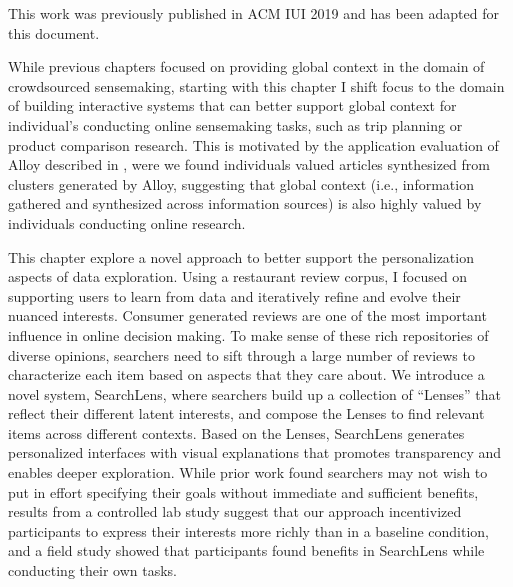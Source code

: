 
{\rmfamily
This work was previously published in ACM IUI 2019 \cite{searchlens} and has been adapted for this document.
}

While previous chapters focused on providing global context in the domain of crowdsourced sensemaking, starting with this chapter I shift focus to the domain of building interactive systems that can better support global context for individual's conducting online sensemaking tasks, such as trip planning or product comparison research. This is motivated by the application evaluation of Alloy described in , were we found individuals valued articles synthesized from clusters generated by Alloy, suggesting that global context (i.e., information gathered and synthesized across information sources) is also highly valued by individuals conducting online research.

This chapter explore a novel approach to better support the personalization  aspects of data exploration. Using a restaurant review corpus, I focused on supporting users to learn from data and iteratively refine and evolve their nuanced interests. Consumer generated reviews are one of the most important influence in online decision making. To make sense of these rich repositories of diverse opinions, searchers need to sift through a large number of reviews to characterize each item based on aspects that they care about. We introduce a novel system, SearchLens, where searchers build up a collection of ``Lenses'' that reflect their different latent interests, and compose the Lenses to find relevant items across different contexts. Based on the Lenses, SearchLens generates personalized interfaces with visual explanations that promotes transparency and enables deeper exploration. While prior work found searchers may not wish to put in effort specifying their goals without immediate and sufficient benefits, results from a controlled lab study suggest that our approach incentivized participants to express their interests more richly than in a baseline condition, and a field study showed that participants found benefits in SearchLens while conducting their own tasks.




